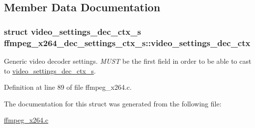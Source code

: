 \subsection{Member Data Documentation}
\subsubsection[{\texorpdfstring{video\+\_\+settings\+\_\+dec\+\_\+ctx}{video_settings_dec_ctx}}]{\setlength{\rightskip}{0pt plus 5cm}struct {\bf video\+\_\+settings\+\_\+dec\+\_\+ctx\+\_\+s} ffmpeg\+\_\+x264\+\_\+dec\+\_\+settings\+\_\+ctx\+\_\+s\+::video\+\_\+settings\+\_\+dec\+\_\+ctx}\hypertarget{structffmpeg__x264__dec__settings__ctx__s_a9bf740944750421577842bcd7cb9bb78}{}\label{structffmpeg__x264__dec__settings__ctx__s_a9bf740944750421577842bcd7cb9bb78}
Generic video decoder settings. {\itshape M\+U\+ST} be the first field in order to be able to cast to \hyperlink{structvideo__settings__dec__ctx__s}{video\+\_\+settings\+\_\+dec\+\_\+ctx\+\_\+s}. 

Definition at line 89 of file ffmpeg\+\_\+x264.\+c.



The documentation for this struct was generated from the following file\+:\begin{DoxyCompactItemize}
\item 
\hyperlink{ffmpeg__x264_8c}{ffmpeg\+\_\+x264.\+c}\end{DoxyCompactItemize}
